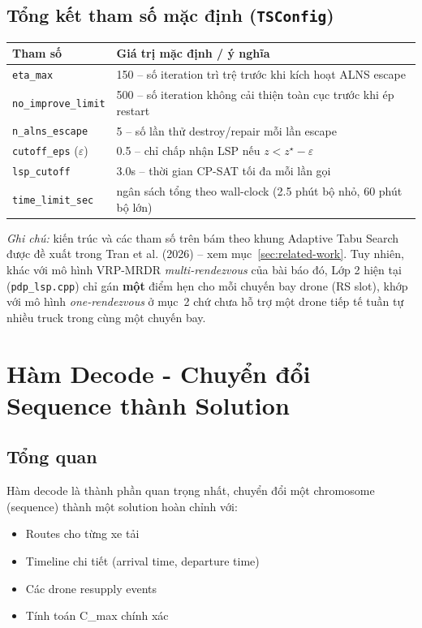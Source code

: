 \documentclass[12pt,a4paper]{article}
\begin{document}
\subsection{Tổng kết tham số mặc định (\texttt{TSConfig})}

\begin{table}[H]
\centering
\begin{tabular}{ll}
\toprule
Tham số & Giá trị mặc định / ý nghĩa\\
\midrule
\texttt{eta\_max} & 150 -- số iteration trì trệ trước khi kích hoạt ALNS escape\\
\texttt{no\_improve\_limit} & 500 -- số iteration không cải thiện toàn cục trước khi ép restart\\
\texttt{n\_alns\_escape} & 5 -- số lần thử destroy/repair mỗi lần escape\\
\texttt{cutoff\_eps} ($\varepsilon$) & 0.5 -- chỉ chấp nhận LSP nếu $z < z^\star-\varepsilon$\\
\texttt{lsp\_cutoff} & 3.0s -- thời gian CP-SAT tối đa mỗi lần gọi\\
\texttt{time\_limit\_sec} & ngân sách tổng theo wall-clock (2.5 phút bộ nhỏ, 60 phút bộ lớn)\\
\bottomrule
\end{tabular}
\end{table}

\emph{Ghi chú:} kiến trúc và các tham số trên bám theo khung Adaptive Tabu Search
được đề xuất trong Tran et al. (2026) -- xem mục~\ref{sec:related-work}. Tuy nhiên,
khác với mô hình VRP-MRDR \emph{multi-rendezvous} của bài báo đó, Lớp 2 hiện tại
(\texttt{pdp\_lsp.cpp}) chỉ gán \textbf{một} điểm hẹn cho mỗi chuyến bay drone (RS
slot), khớp với mô hình \emph{one-rendezvous} ở mục~2 chứ chưa hỗ trợ một drone tiếp
tế tuần tự nhiều truck trong cùng một chuyến bay.

\section{Hàm Decode - Chuyển đổi Sequence thành Solution}

\subsection{Tổng quan}

Hàm decode là thành phần quan trọng nhất, chuyển đổi một chromosome (sequence) thành một solution hoàn chỉnh với:
\begin{itemize}
    \item Routes cho từng xe tải
    \item Timeline chi tiết (arrival time, departure time)
    \item Các drone resupply events
    \item Tính toán C\_max chính xác
\end{itemize}
\end{document}
